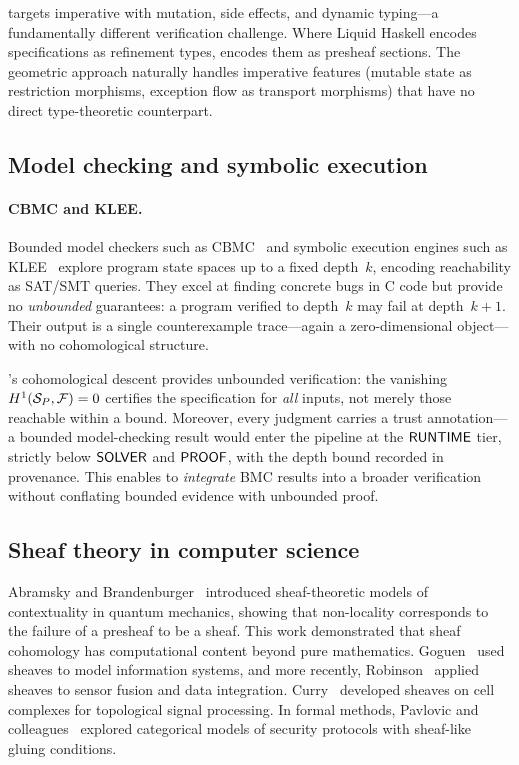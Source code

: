 \JuGeo{} targets imperative \Python{} with mutation, side effects, and
dynamic typing---a fundamentally different verification challenge.  Where
Liquid Haskell encodes specifications as refinement types, \JuGeo{} encodes
them as presheaf sections.  The geometric approach naturally handles
imperative features (mutable state as restriction morphisms, exception
flow as transport morphisms) that have no direct type-theoretic counterpart.

\subsection{Model checking and symbolic execution}\label{sec:related:model-checking}

\paragraph{CBMC and KLEE.}
Bounded model checkers such as CBMC~\cite{cbmc} and symbolic execution
engines such as KLEE~\cite{klee} explore program state spaces up to a
fixed depth~$k$, encoding reachability as SAT/SMT queries.  They excel at
finding concrete bugs in C code but provide no \emph{unbounded}
guarantees: a program verified to depth~$k$ may fail at depth~$k{+}1$.
Their output is a single counterexample trace---again a zero-dimensional
object---with no cohomological structure.

\JuGeo{}'s cohomological descent provides unbounded verification: the
vanishing $H^{1}(\mathcal{S}_P, \mathcal{F}) = 0$ certifies the
specification for \emph{all} inputs, not merely those reachable within
a bound.  Moreover, every judgment carries a trust annotation---a
bounded model-checking result would enter the \JuGeo{} pipeline at
the $\mathsf{RUNTIME}$ tier, strictly below $\mathsf{SOLVER}$ and $\mathsf{PROOF}$,
with the depth bound recorded in provenance.  This enables \JuGeo{} to
\emph{integrate} BMC results into a broader verification without
conflating bounded evidence with unbounded proof.

\subsection{Sheaf theory in computer science}\label{sec:related:sheaf-cs}

Abramsky and Brandenburger~\cite{abramsky2011} introduced
sheaf-theoretic models of contextuality in quantum mechanics, showing
that non-locality corresponds to the failure of a presheaf to be a sheaf.
This work demonstrated that sheaf cohomology has computational content
beyond pure mathematics.  Goguen~\cite{goguen1992} used sheaves to model
information systems, and more recently, Robinson~\cite{robinson2014}
applied sheaves to sensor fusion and data integration.
Curry~\cite{curry2014} developed sheaves on cell complexes for topological
signal processing.  In formal methods, Pavlovic and
colleagues~\cite{pavlovic2012} explored categorical models of security
protocols with sheaf-like gluing conditions.


